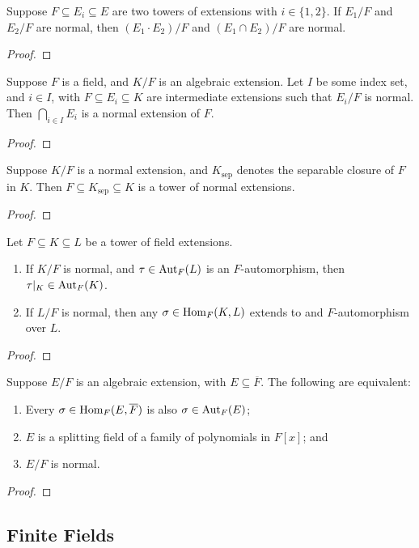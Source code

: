 \begin{lemma}
    Suppose \(F \subseteq E_i \subseteq E\) are two towers of extensions with \(i \in \{1,2\}\).
    If \(E_1/F\) and \(E_2/F\) are normal,
    then \((E_1 \cdot E_2)/F\) and \((E_1 \cap E_2)/F\) are normal.
\end{lemma}
\begin{proof}
\end{proof}
\begin{lemma}
    Suppose \(F\) is a field, and \(K/F\) is an algebraic extension.
    Let \(I\) be some index set, and \(i \in I\),
    with \(F \subseteq E_i \subseteq K\) are intermediate extensions
    such that \(E_i/F\) is normal.
    Then \(\bigcap_{i \in I} E_i\) is a normal extension of \(F\).
\end{lemma}
\begin{proof}
\end{proof}
\begin{lemma}
    Suppose \(K/F\) is a normal extension,
    and \(K_\text{sep}\) denotes the separable closure of \(F\) in \(K\).
    Then \(F \subseteq K_\text{sep} \subseteq K\) is a tower of normal extensions.
\end{lemma}
\begin{proof}
\end{proof}

\begin{proposition}
    Let \(F \subseteq K \subseteq L\) be a tower of field extensions.
    \begin{enumerate}[label={(\alph*)}, itemsep=0mm]
        \item If \(K/F\) is normal, and \(\tau \in \operatorname{Aut}_F(L)\) is an \(F\)-automorphism,
            then \(\tau\vert_K \in \operatorname{Aut}_F(K)\).
        \item If \(L/F\) is normal, then any \(\sigma \in \operatorname{Hom}_F(K,L)\)
            extends to and \(F\)-automorphism over \(L\).
    \end{enumerate}
\end{proposition}
\begin{proof}
\end{proof}

\begin{theorem}
    Suppose \(E/F\) is an algebraic extension, with \(E \subseteq \overline{F}\).
    The following are equivalent:
    \begin{enumerate}[label={(\alph*)}, itemsep=0mm]
        \item Every \(\sigma\in\operatorname{Hom}_F(E,\overline{F})\) is also \(\sigma\in\operatorname{Aut}_F(E)\);
        \item \(E\) is a splitting field of a family of polynomials in \(F[x]\); and
        \item \(E/F\) is normal.
    \end{enumerate}
\end{theorem}
\begin{proof}
\end{proof}

\subsection{Finite Fields}

